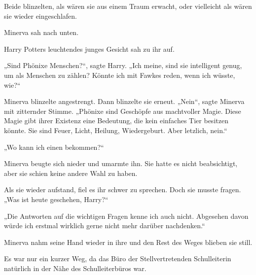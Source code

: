 Beide blinzelten, als wären sie aus einem Traum erwacht, oder vielleicht als wären sie wieder eingeschlafen.

Minerva sah nach unten.

Harry Potters leuchtendes junges Gesicht sah zu ihr auf.

„Sind Phönixe Menschen?“, sagte Harry. „Ich meine, sind sie intelligent genug, um als Menschen zu zählen? Könnte ich mit Fawkes reden, wenn ich wüsste, wie?“

Minerva blinzelte angestrengt. Dann blinzelte sie erneut. „Nein“, sagte Minerva mit zitternder Stimme. „Phönixe sind Geschöpfe aus machtvoller Magie. Diese Magie gibt ihrer Existenz eine Bedeutung, die kein einfaches Tier besitzen könnte. Sie sind Feuer, Licht, Heilung, Wiedergeburt. Aber letzlich, nein.“

„Wo kann ich einen bekommen?“

Minerva beugte sich nieder und umarmte ihn. Sie hatte es nicht beabsichtigt, aber sie schien keine andere Wahl zu haben.

Als sie wieder aufstand, fiel es ihr schwer zu sprechen. Doch sie musste fragen. „Was ist heute geschehen, Harry?“

„Die Antworten auf die wichtigen Fragen kenne ich auch nicht. Abgesehen davon würde ich erstmal wirklich gerne nicht mehr darüber nachdenken.“

Minerva nahm seine Hand wieder in ihre und den Rest des Weges blieben sie still.

Es war nur ein kurzer Weg, da das Büro der Stellvertretenden Schulleiterin natürlich in der Nähe des Schulleiterbüros war.


